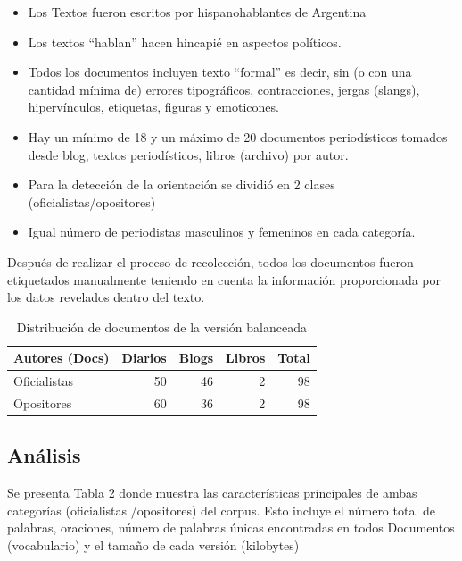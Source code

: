 \documentclass[a4paper,10pt]{article}
\begin{document}
\begin{itemize}
	\item Los Textos fueron escritos por hispanohablantes de Argentina 
	\item Los textos “hablan” hacen hincapié en aspectos políticos.
	\item Todos los documentos incluyen texto “formal” es decir, sin (o con una cantidad mínima de) errores tipográficos, contracciones, jergas (slangs), hipervínculos, etiquetas, figuras y emoticones.
	\item Hay un mínimo de 18 y un máximo de 20 documentos periodísticos tomados desde blog, textos periodísticos, libros (archivo) por autor.
	\item Para la detección de la orientación se dividió en 2 clases (oficialistas/opositores)
	\item Igual número de periodistas masculinos y femeninos en cada categoría.
 
\end{itemize}
Después de realizar el proceso de recolección, todos los documentos fueron etiquetados manualmente teniendo en cuenta la información proporcionada por los datos revelados dentro del texto.

	\begin{table}[htbp]
	\centering
	\begin{tabular}{lrrrr}
		\multicolumn{1}{c}{Autores (Docs) } & \multicolumn{1}{c}{Diarios} & \multicolumn{1}{c}{Blogs } & \multicolumn{1}{c}{Libros} & \multicolumn{1}{c}{Total} \\
		\midrule
		Oficialistas & 50    & 46    & 2     & 98 \\
		Opositores & 60    & 36    & 2     & 98 \\
		\bottomrule
	\end{tabular}%
	\label{tab:tabla1}%
	\caption{Distribución de documentos de la versión balanceada }
	\end{table}

\subsection{Análisis}
 Se presenta Tabla 2 donde muestra las características principales de ambas categorías (oficialistas /opositores) del corpus. Esto incluye el número total de palabras, oraciones, número de palabras únicas encontradas en todos Documentos (vocabulario) y el tamaño de cada versión (kilobytes)
 
\end{document}
